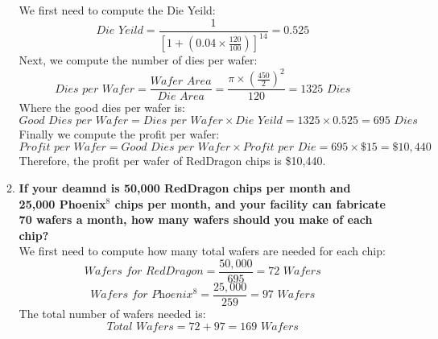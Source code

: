 \begin{enumerate}
\begin{enumerate}
                    We first need to compute the Die Yeild:
                    \begin{equation*}
                        \textit{Die Yeild} = \frac{1}{[1 + (0.04 \times \frac{120}{100})]^{14}} = 0.525
                    \end{equation*}
                    Next, we compute the number of dies per wafer:
                    \begin{equation*}
                        \textit{Dies per Wafer} = \frac{\textit{Wafer Area}}{\textit{Die Area}} = \frac{\pi \times (\frac{450}{2})^{2}}{120} = 1325 \textit{ Dies}
                    \end{equation*}
                    Where the good dies per wafer is:
                    \begin{equation*}
                        \textit{Good Dies per Wafer} = \textit{Dies per Wafer} \times \textit{Die Yeild} = 1325 \times 0.525 = 695 \textit{ Dies}
                    \end{equation*}
                    Finally we compute the profit per wafer:
                    \begin{equation*}
                        \textit{Profit per Wafer} = \textit{Good Dies per Wafer} \times \textit{Profit per Die} = 695 \times \$15 = \$10,440
                    \end{equation*}
                    Therefore, the profit per wafer of RedDragon chips is \$10,440.
              \item \textbf{If your deamnd is 50,000 RedDragon chips per month and 25,000 Phoenix$^{8}$ chips per month, and your facility can fabricate 70 wafers a month, how many wafers should you make of each chip?} \\
                    We first need to compute how many total wafers are needed for each chip:
                    \begin{equation*}
                        \textit{Wafers for RedDragon} = \frac{50,000}{695} = 72 \textit{ Wafers}
                    \end{equation*}
                    \begin{equation*}
                        \textit{Wafers for Phoenix$^{8}$} = \frac{25,000}{259} = 97 \textit{ Wafers}
                    \end{equation*}
                    The total number of wafers needed is:
                    \begin{equation*}
                        \textit{Total Wafers} = 72 + 97 = 169 \textit{ Wafers}

\end{equation*}
\end{enumerate}
\end{enumerate}
